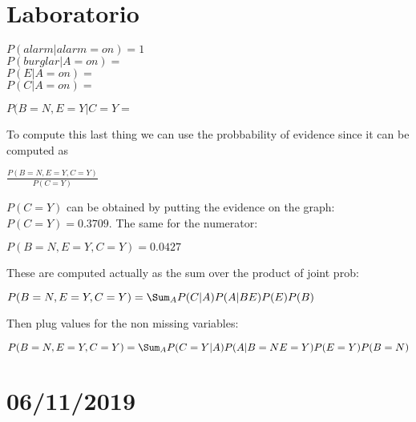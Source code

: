 \chapter{Laboratorio}
\begin{center}
	$\displaystyle P(alarm\vert alarm=on)=1$\\
	$P(burglar\vert A=on)=$\\
	$P(E\vert A=on)=$\\
	$P(C\vert A=on)=$
\end{center}
\begin{center}
	$\displaystyle P(B=N,E=Y\vert C=Y=$
\end{center}
To compute this last thing we can use the probbability of evidence since it can be computed as 
\begin{center}
	$\displaystyle \frac{P(B=N, E=Y,C=Y)}{P(C=Y)}$
\end{center}
$P(C=Y)$ can be obtained by putting the evidence on the graph: $P(C=Y)=0.3709$. The same for the numerator:
\begin{center}
	$\displaystyle P(B=N, E=Y,C=Y)=0.0427$
\end{center}
These are computed actually as the sum over the product of joint prob:
\begin{center}
	$\displaystyle P(B=N, E=Y,C=Y)=\Sum_A P(C\vert A)P(A\vert B E)P(E)P(B)$
\end{center}
Then plug values for the non missing variables:
\begin{center}
	$\displaystyle P(B=N, E=Y,C=Y)=\Sum_A P(C=Y\vert A)P(A\vert B=N E=Y)P(E=Y)P(B=N)$
\end{center}

\chapter{06/11/2019}
